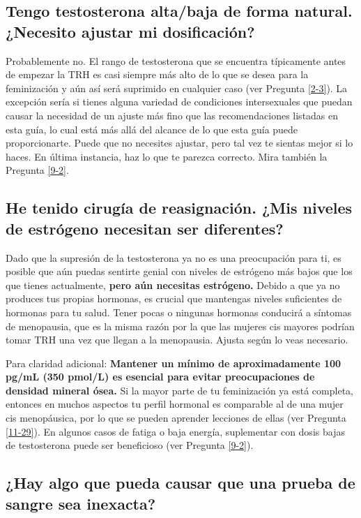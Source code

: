 \documentclass{article}
\begin{document}
\subsection{Tengo testosterona alta/baja de forma natural. ¿Necesito ajustar mi dosificación?}

Probablemente no. El rango de testosterona que se encuentra típicamente antes de empezar la TRH es casi siempre más alto de lo que se desea para la feminización y aún así será suprimido en cualquier caso (ver Pregunta \ref{2-3}). La excepción sería si tienes alguna variedad de condiciones intersexuales que puedan causar la necesidad de un ajuste más fino que las recomendaciones listadas en esta guía, lo cual está más allá del alcance de lo que esta guía puede proporcionarte. Puede que no necesites ajustar, pero tal vez te sientas mejor si lo haces. En última instancia, haz lo que te parezca correcto. Mira también la Pregunta \ref{9-2}.

\subsection{He tenido cirugía de reasignación. ¿Mis niveles de estrógeno necesitan ser diferentes?}

Dado que la supresión de la testosterona ya no es una preocupación para ti, es posible que aún puedas sentirte genial con niveles de estrógeno más bajos que los que tienes actualmente, \textbf{pero aún necesitas estrógeno.} Debido a que ya no produces tus propias hormonas, es crucial que mantengas niveles suficientes de hormonas para tu salud. Tener pocas o ningunas hormonas conducirá a síntomas de menopausia, que es la misma razón por la que las mujeres cis mayores podrían tomar TRH una vez que llegan a la menopausia. Ajusta según lo veas necesario.

Para claridad adicional: \textbf{Mantener un mínimo de aproximadamente 100 pg/mL (350 pmol/L) es esencial para evitar preocupaciones de densidad mineral ósea.} Si la mayor parte de tu feminización ya está completa, entonces en muchos aspectos tu perfil hormonal es comparable al de una mujer cis menopáusica, por lo que se pueden aprender lecciones de ellas (ver Pregunta \ref{11-29}). En algunos casos de fatiga o baja energía, suplementar con dosis bajas de testosterona puede ser beneficioso (ver Pregunta \ref{9-2}).

\subsection{¿Hay algo que pueda causar que una prueba de sangre sea inexacta?}
\end{document}
